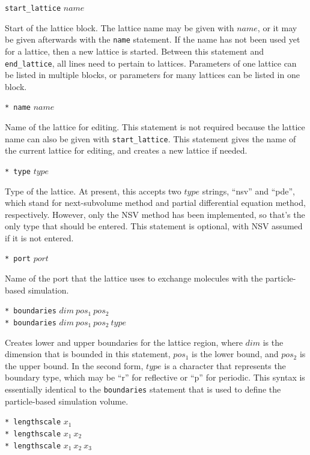 \documentclass {scrbook}
\newcommand {\ttt} {\texttt}
\begin{document}
\begin{description}

\item{\ttt{start\_lattice} $name$}

Start of the lattice block. The lattice name may be given with $name$, or it may be given afterwards with the \ttt{name} statement. If the name has not been used yet for a lattice, then a new lattice is started. Between this statement and \ttt{end\_lattice}, all lines need to pertain to lattices. Parameters of one lattice can be listed in multiple blocks, or parameters for many lattices can be listed in one block.

\item{\ttt{* name} $name$}

Name of the lattice for editing. This statement is not required because the lattice name can also be given with \ttt{start\_lattice}. This statement gives the name of the current lattice for editing, and creates a new lattice if needed.

\item{\ttt{* type} $type$}

Type of the lattice. At present, this accepts two $type$ strings, ``nsv'' and ``pde'', which stand for next-subvolume method and partial differential equation method, respectively. However, only the NSV method has been implemented, so that's the only type that should be entered. This statement is optional, with NSV assumed if it is not entered.

\item{\ttt{* port} $port$}

Name of the port that the lattice uses to exchange molecules with the particle-based simulation.

\item{\ttt{* boundaries} $dim\ pos_1\ pos_2$\\
\ttt{* boundaries} $dim\ pos_1\ pos_2\ type$}

Creates lower and upper boundaries for the lattice region, where $dim$ is the dimension that is bounded in this statement, $pos_1$ is the lower bound, and $pos_2$ is the upper bound. In the second form, $type$ is a character that represents the boundary type, which may be ``r'' for reflective or ``p'' for periodic. This syntax is essentially identical to the \ttt{boundaries} statement that is used to define the particle-based simulation volume.

\item{\ttt{* lengthscale} $x_1$\\
\ttt{* lengthscale} $x_1\ x_2$\\
\ttt{* lengthscale} $x_1\ x_2\ x_3$}


\end{description}
\end{document}
